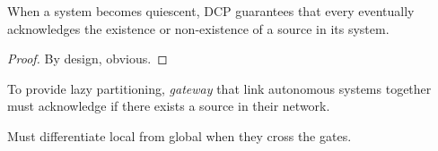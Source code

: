 \begin{definition}
\end{definition}

\begin{lemma}
  When a system becomes quiescent, DCP guarantees that every \process
  eventually acknowledges the existence or non-existence of a source
  in its system.
\end{lemma}

\begin{proof}
  By design, obvious.
\end{proof}

To provide lazy partitioning, \emph{gateway} \nodes that link
autonomous systems together must acknowledge if there exists a source
in their network.

Must differentiate local from global when they cross the gates.





